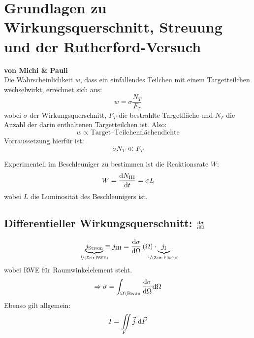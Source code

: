 \documentclass[Ex4_Zusammenfassung.tex]{subfiles}
\begin{document}
\section{Grundlagen zu Wirkungsquerschnitt, Streuung und der Rutherford-Versuch}
\textbf{von Michi \& Pauli}\\

Die Wahrscheinlichkeit $w$, dass ein einfallendes Teilchen mit einem Targetteilchen wechselwirkt, errechnet sich aus:
\begin{equation}
	w = \sigma \frac{N_T}{F_T}
\end{equation}
wobei $\sigma$ der Wirkungsquerschnitt,  $F_T$ die bestrahlte Targetfläche und $N_T$ die Anzahl der darin enthaltenen Targetteilchen ist. Also:
\begin{equation*}
	w \propto \text{Target--Teilchenflächendichte}
\end{equation*}
Vorraussetzung hierfür ist:
\begin{equation*}
	\sigma N_T \ll F_T
\end{equation*}

Experimentell im Beschleuniger zu bestimmen ist die Reaktionsrate $W$: 
\begin{equation}
	W = \frac{\md N_{\text{\rom{3}}}}{\md t} = \sigma L
\end{equation}
wobei $L$ die Luminosität des Beschleunigers ist.\\

\subsection*{Differentieller Wirkungsquerschnitt: $\frac{\mathrm{d} \sigma}{\mathrm{d} \Omega}$}
\begin{equation}
	\underbrace{j_{\text{Strom}}}_{\mathclap{\nicefrac{1}{\text{(Zeit$\cdot$RWE)} }} } \equiv j_{\text{\rom{3}}} = \derive{\sigma}{\Omega} \lp \Omega \rp \cdot \underbrace{j_{\text{\rom{1}}}}_{\mathclap{\nicefrac{1}{\text{(Zeit$\cdot$Fläche) }} } } 
\end{equation}
wobei RWE für Raumwinkelelement steht. 
\begin{equation}
	\Rightarrow \sigma = \int_{\Omega \setminus \text{Beam} }\frac{\mathrm{d} \sigma}{\mathrm{d} \Omega} \mathrm{d} \Omega
\end{equation}
Ebenso gilt allgemein:
\begin{equation}
	I = \mathop{\int \kern -0.7em \int}_{\kern -0.6em F} \vec{j}\ \mathrm{d} \vec{F}
\end{equation}
\end{document}
